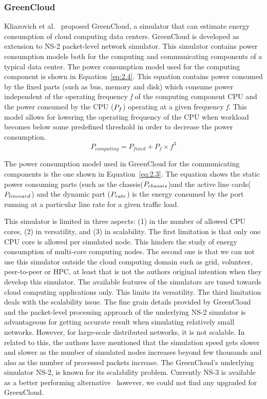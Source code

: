 \subsubsection{GreenCloud}
Kliazovich et al.~\cite{DBLP:journals/tjs/KliazovichBK12} proposed GreenCloud, a simulator that can estimate energy consumption of cloud computing data centers. GreenCloud is developed as extension to NS-2 packet-level network simulator. This simulator contains power consumption models both for the computing and communicating components of a typical data center. The power consumption model used for the computing component is shown in Equation~\ref{eq:2.4}. This equation contains power consumed by the fixed parts (such as bus, memory and disk) which consume power independent of the operating frequency \emph{f} of the computing component CPU and the power consumed by the CPU (\($$P_f$$\)) operating at a given frequency \emph{f}. This model allows for lowering the operating frequency of the CPU when workload becomes below some predefined threshold in order to decrease the power consumption. 
\begin{equation} \label{eq:2.4}
P_{computing} = P_{fixed} + P_f \times f^3
\end{equation}

The power consumption model used in GreenCloud for the communicating components is the one shown in Equation~\ref{eq:2.3}. The equation shows the static power consuming parts (such as the chassis(\($$P_{chassis}$$\))and the active line cards(\($$P_{linecard}$$\)) and the dynamic part (\($$P_{rate}$$\)) is the energy consumed by the port running at a particular line rate for a given traffic load. 

This simulator is limited in three aspects: (1) in the number of allowed CPU cores, (2) in versatility, and (3) in scalability. The first limitation is that only one CPU core is allowed per simulated node. This hinders the study of energy consumption of multi-core computing nodes. The second one is that we can not use this simulator outside the cloud computing domain such as grid, volunteer, peer-to-peer or HPC, at least that is not the authors original intention when they develop this simulator. The available features of the simulators are tuned towards cloud computing applications only. This limits its versatility. The third limitation deals with the scalability issue. The fine grain details provided by GreenCloud and the packet-level processing approach of the underlying NS-2 simulator is advantageous for getting accurate result when simulating relatively small networks. However, for large-scale distributed networks, it is not scalable. In related to this, the authors have mentioned that the simulation speed gets slower and slower as the number of simulated nodes increases beyond few thousands and also as the number of processed packets increase. The GreenCloud's underlying simulator NS-2, is known for its scalability problem. Currently NS-3 is available as a better performing alternative~\cite{DBLP:conf/icc/WeingartnerLW09} however, we could not find any upgraded for GreenCloud.

